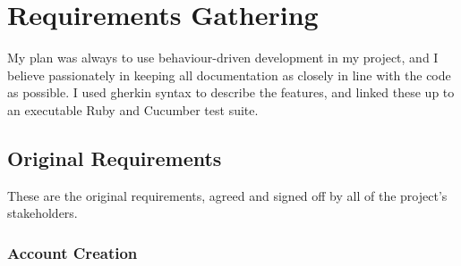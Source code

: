 \chapter{Requirements Gathering}\label{appendix:requirements}

My plan was always to use behaviour-driven development in my project, and I believe passionately in keeping all documentation as closely in line with the code as possible. I used gherkin syntax to describe the features, and linked these up to an executable Ruby and Cucumber test suite.

\section{Original Requirements}

These are the original requirements, agreed and signed off by all of the project's stakeholders. %

\subsection{Account Creation}

